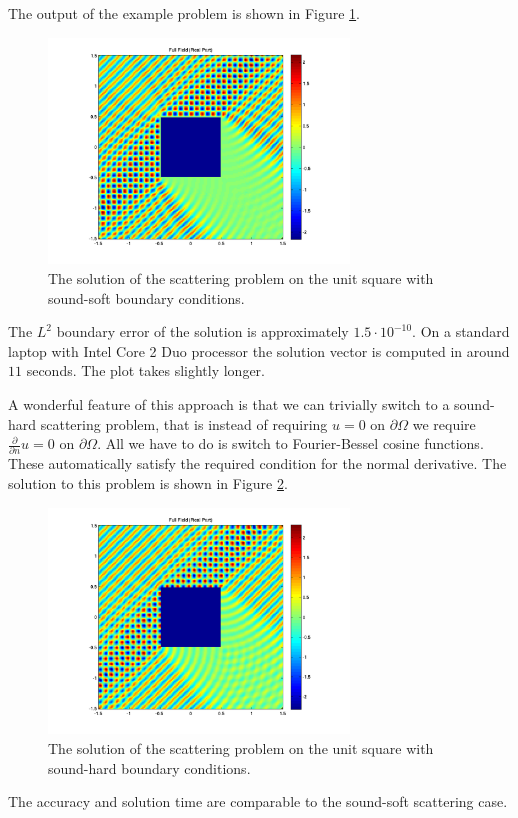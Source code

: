 The output of the example problem is shown in Figure \ref{fig:squareplot}.
\begin{figure}
\center
\includegraphics[width=8cm]{squareplot}
\caption{The solution of the scattering problem on the unit
  square with sound-soft boundary conditions.}
\label{fig:squareplot}
\end{figure}
The $L^2$ boundary error of the solution is approximately $1.5\cdot
10^{-10}$. On a standard laptop with Intel Core 2 Duo processor the
solution vector is computed in around $11$ seconds. The plot takes
slightly longer.

A wonderful feature of this approach is that we can trivially switch
to a sound-hard scattering problem, that is instead of requiring $u=0$
on $\partial\Omega$ we require $\frac{\partial}{\partial n} u=0$ on
$\partial\Omega$. All we have to do is switch to Fourier-Bessel cosine
functions. These automatically satisfy the required condition for the
normal derivative. The solution to this problem is shown in Figure
\ref{fig:squareplot2}.
\begin{figure}
\center
\includegraphics[width=8cm]{squareplot2}
\caption{The solution of the scattering problem on the unit
  square with sound-hard boundary conditions.}
\label{fig:squareplot2}
\end{figure}
The accuracy and solution time are comparable to the sound-soft
scattering case.












